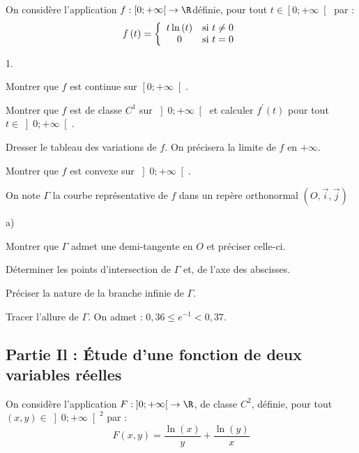 \documentclass[11pt]{article}%
\begin{document}
On considère l'application $f :\left[ 0; + \infty\right[ \rightarrow
\R$définie, pour tout $t\in\left[ 0; + \infty\right[ $ par :
\[
f\left( t\right) = \left\{
\begin{array}
[c]{cc}t\ln\left( t\right) & \text{si }t\neq0\\
0 & \text{si }t = 0
\end{array}
\right.
\]


\begin{noliste}{1.}
 \setlength{\itemsep}{4mm}
\item Montrer que $f$ est continue sur $\left[ 0; + \infty\right[ $.

\item Montrer que $f$ est de classe $C^{1}$ sur $\left] 0; +
\infty\right[ $
et calculer $f^{\prime}\left( t\right) $ pour tout $t\in\left]
0; + \infty\right[ $.

\item Dresser le tableau des variations de $f$. On précisera la limite
de
$f$ en $ + \infty$.

\item Montrer que $f$ est convexe sur $\left] 0; + \infty\right[ $.

\item On note $\Gamma$ la courbe représentative de $f$ dans un repère
orthonormal $\left( O,\vec{i},\vec{j}\right) $

\begin{noliste}{a)}
 \setlength{\itemsep}{2mm}
\item Montrer que $\Gamma$ admet une demi-tangente en $O$ et préciser
celle-ci.

\item Déterminer les points d'intersection de $\Gamma$ et, de l'axe des
abscisses.

\item Préciser la nature de la branche infinie de $\Gamma$.

\item Tracer l'allure de $\Gamma$. On admet : $0,36\leq e^{-1}<0,37.$
\end{noliste}
\end{noliste}

\subsection*{Partie Il : Étude d'une fonction de deux variables
réelles}

On considère l'application $F :\left] 0; + \infty\right[ \rightarrow
\R$, de classe $C^{2}$, définie, pour tout $\left( x,y\right)
\in\left] 0; + \infty\right[ ^{2}$ par :
\[
F\left( x,y\right) = \frac{\ln\left( x\right) }{y} + \frac{\ln\left(
y\right) }{x}
\]
\end{document}
